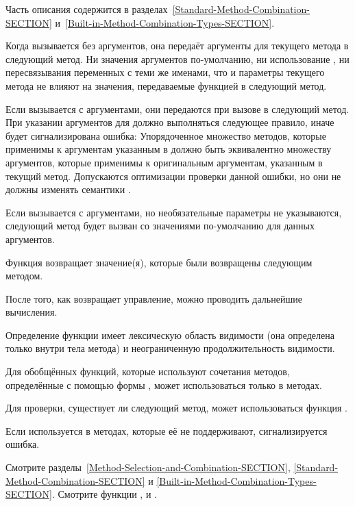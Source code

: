 \begin{defun}[Функция]
Часть описания  содержится в
разделах~\ref{Standard-Method-Combination-SECTION} 
и~\ref{Built-in-Method-Combination-Types-SECTION}. 

Когда  вызывается без аргументов, она передаёт аргументы
для текущего метода в следующий метод. Ни значения аргументов по-умолчанию, ни
использование , ни пересвязывания переменных с теми же именами, что и
параметры текущего метода не влияют на значения, передаваемые функцией
 в следующий метод.

Если  вызывается с аргументами, они передаются при вызове
в следующий метод. При указании аргументов для  должно
выполняться следующее правило, иначе будет сигнализирована ошибка: 
Упорядоченное множество методов, которые применимы к аргументам указанным в
 должно быть эквивалентно множеству аргументов, которые
применимы к оригинальным аргументам, указанным в текущий метод.
Допускаются оптимизации проверки данной ошибки, но они не должны
изменять семантики .

Если  вызывается с аргументами, но необязательные
параметры не указываются, следующий метод будет вызван со значениями
по-умолчанию для данных аргументов.

Функция  возвращает значение(я), которые были возвращены
следующим методом.

После того, как  возвращает управление, можно проводить
дальнейшие вычисления.

Определение функции  имеет лексическую область видимости
(она определена только внутри тела метода) и неограниченную продолжительность видимости.

Для обобщённых функций, которые используют сочетания методов, определённые с
помощью формы ,  может
использоваться только в  методах.

Для проверки, существует ли следующий метод, может использоваться функция
.

Если  используется в методах, которые её не поддерживают,
сигнализируется ошибка.

Смотрите разделы~\ref{Method-Selection-and-Combination-SECTION}, 
\ref{Standard-Method-Combination-SECTION} и
\ref{Built-in-Method-Combination-Types-SECTION}.
Смотрите функции ,
и .
\end{defun}


